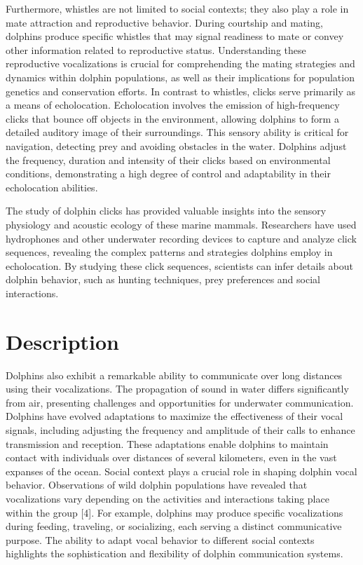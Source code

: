 \documentclass{article}
\begin{document}
\begin{multicols}{2}
Furthermore, whistles are not limited to social contexts; they also play a role in mate attraction and reproductive behavior. During courtship and mating, dolphins produce specific whistles that may signal readiness to mate or convey other information related to reproductive status. Understanding these reproductive vocalizations is crucial for comprehending the mating strategies and dynamics within dolphin populations, as well as their implications for population genetics and conservation efforts. In contrast to whistles, clicks serve primarily as a means of echolocation. Echolocation involves the emission of high-frequency clicks that bounce off objects in the environment, allowing dolphins to form a detailed auditory image of their surroundings. This sensory ability is critical for navigation, detecting prey and avoiding obstacles in the water. Dolphins adjust the frequency, duration and intensity of their clicks based on environmental conditions, demonstrating a high degree of control and adaptability in their echolocation abilities.

The study of dolphin clicks has provided valuable insights into the sensory physiology and acoustic ecology of these marine mammals. Researchers have used hydrophones and other underwater recording devices to capture and analyze click sequences, revealing the complex patterns and strategies dolphins employ in echolocation. By studying these click sequences, scientists can infer details about dolphin behavior, such as hunting techniques, prey preferences and social interactions.

\section*{\color{color_100238}Description}
Dolphins also exhibit a remarkable ability to communicate over long distances using their vocalizations. The propagation of sound in water differs significantly from air, presenting challenges and opportunities for underwater communication. Dolphins have evolved adaptations to maximize the effectiveness of their vocal signals, including adjusting the frequency and amplitude of their calls to enhance transmission and reception. These adaptations enable dolphins to maintain contact with individuals over distances of several kilometers, even in the vast expanses of the ocean. Social context plays a crucial role in shaping dolphin vocal behavior. Observations of wild dolphin populations have revealed that vocalizations vary depending on the activities and interactions taking place within the group [4]. For example, dolphins may produce specific vocalizations during feeding, traveling, or socializing, each serving a distinct communicative purpose. The ability to adapt vocal behavior to different social contexts highlights the sophistication and flexibility of dolphin communication systems.


\end{multicols}
\end{document}
